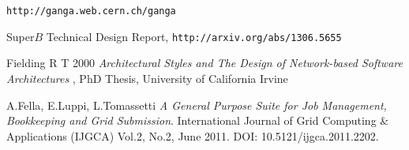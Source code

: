 \documentclass[a4paper]{jpconf}
\begin{document}
\begin{thebibliography}{30}








\verb"http://ganga.web.cern.ch/ganga"










Super$B$ Technical Design Report, \verb"http://arxiv.org/abs/1306.5655"

Fielding R T 2000 {\it Architectural Styles and The Design of Network-based
Software Architectures }, PhD Thesis, University of California Irvine

A.Fella, E.Luppi, L.Tomassetti \emph{A General Purpose Suite for Job Management, Bookkeeping and Grid Submission}. International Journal of Grid Computing \& Applications (IJGCA) Vol.2, No.2, June 2011. DOI: 10.5121/ijgca.2011.2202.

\end{thebibliography}
\end{document}
